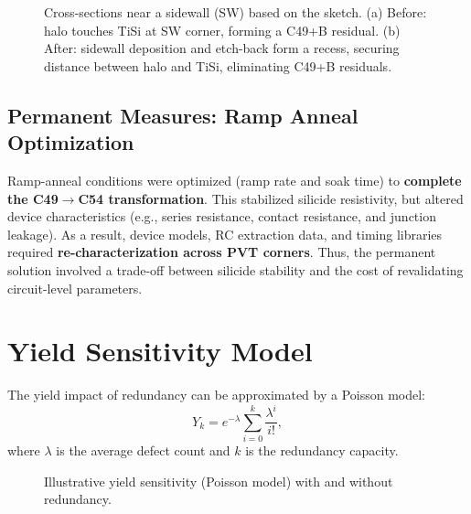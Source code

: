 \documentclass[conference]{IEEEtran}
\begin{document}
\begin{figure*}[!t]
{}
  \caption{Cross-sections near a sidewall (SW) based on the sketch.
  (a) Before: halo touches TiSi at SW corner, forming a C49+B residual. 
  (b) After: sidewall deposition and etch-back form a recess, securing distance between halo and TiSi, eliminating C49+B residuals.}
  \label{fig:fig2_sketch}
\end{figure*}

\subsection{Permanent Measures: Ramp Anneal Optimization}
Ramp-anneal conditions were optimized (ramp rate and soak time)
to \textbf{complete the C49$\rightarrow$C54 transformation}. This
stabilized silicide resistivity, but altered device characteristics
(e.g., series resistance, contact resistance, and junction leakage).
As a result, device models, RC extraction data, and timing libraries
required \textbf{re-characterization across PVT corners}. Thus, the
permanent solution involved a trade-off between silicide stability and
the cost of revalidating circuit-level parameters.

\section{Yield Sensitivity Model}
The yield impact of redundancy can be approximated by a Poisson model:
\[
Y_k = e^{-\lambda} \sum_{i=0}^{k} \frac{\lambda^i}{i!},
\]
where $\lambda$ is the average defect count and $k$ is the redundancy capacity.

\begin{figure}[!t]
  \centering
  \caption{Illustrative yield sensitivity (Poisson model) with and without redundancy.}
  \label{fig:yield}
\end{figure}
\end{document}
